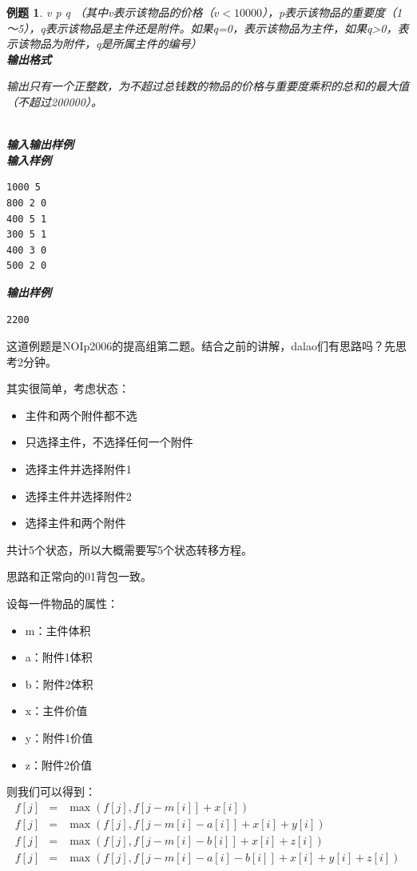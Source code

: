 \documentclass{article}
\newtheorem{example}{例题}[subsection]
\theoremstyle{nonumberplain}
\begin{document}
\begin{example}
	v p q （其中v表示该物品的价格（$v<10000$），p表示该物品的重要度（1～5），q表示该物品是主件还是附件。如果q=0，表示该物品为主件，如果q>0，表示该物品为附件，q是所属主件的编号）\\
	\textbf{输出格式}

	输出只有一个正整数，为不超过总钱数的物品的价格与重要度乘积的总和的最大值（不超过200000）。
	\par
	\ \\
	\textbf{输入输出样例}\\
	\textbf{输入样例}
	\begin{verbatim}
1000 5
800 2 0
400 5 1
300 5 1
400 3 0
500 2 0
\end{verbatim}
	\textbf{输出样例}
	\begin{verbatim}
2200
\end{verbatim}
\end{example}

这道例题是NOIp2006的提高组第二题。结合之前的讲解，dalao们有思路吗？先思考2分钟。

其实很简单，考虑状态：
\begin{itemize}
	\item{主件和两个附件都不选}
	\item{只选择主件，不选择任何一个附件}
	\item{选择主件并选择附件1}
	\item{选择主件并选择附件2}
	\item{选择主件和两个附件}
\end{itemize}

共计5个状态，所以大概需要写5个状态转移方程。

思路和正常向的01背包一致。

设每一件物品的属性：
\begin{itemize}
	\item{m：主件体积}
	\item{a：附件1体积}
	\item{b：附件2体积}
	\item{x：主件价值}
	\item{y：附件1价值}
	\item{z：附件2价值}
\end{itemize}
则我们可以得到：
\begin{eqnarray*}
	f[j]&=&\max(f[j],f[j-m[i]]+x[i])\\
	f[j]&=&\max(f[j],f[j-m[i]-a[i]]+x[i]+y[i])\\
	f[j]&=&\max(f[j],f[j-m[i]-b[i]]+x[i]+z[i])\\
	f[j]&=&\max(f[j],f[j-m[i]-a[i]-b[i]]+x[i]+y[i]+z[i])
\end{eqnarray*}
\end{document}
